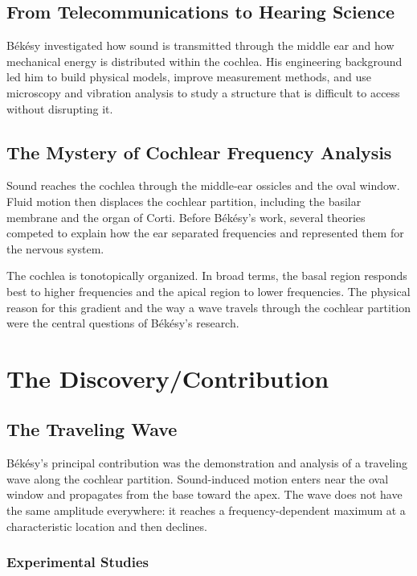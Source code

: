 \subsection{From Telecommunications to Hearing Science}

B\'ek\'esy investigated how sound is transmitted through the middle ear and how mechanical energy is distributed within the cochlea. His engineering background led him to build physical models, improve measurement methods, and use microscopy and vibration analysis to study a structure that is difficult to access without disrupting it.

\subsection{The Mystery of Cochlear Frequency Analysis}

Sound reaches the cochlea through the middle-ear ossicles and the oval window. Fluid motion then displaces the cochlear partition, including the basilar membrane and the organ of Corti. Before B\'ek\'esy's work, several theories competed to explain how the ear separated frequencies and represented them for the nervous system.

The cochlea is tonotopically organized. In broad terms, the basal region responds best to higher frequencies and the apical region to lower frequencies. The physical reason for this gradient and the way a wave travels through the cochlear partition were the central questions of B\'ek\'esy's research.

\section{The Discovery/Contribution}

\subsection{The Traveling Wave}

B\'ek\'esy's principal contribution was the demonstration and analysis of a traveling wave along the cochlear partition. Sound-induced motion enters near the oval window and propagates from the base toward the apex. The wave does not have the same amplitude everywhere: it reaches a frequency-dependent maximum at a characteristic location and then declines.

\subsubsection{Experimental Studies}

